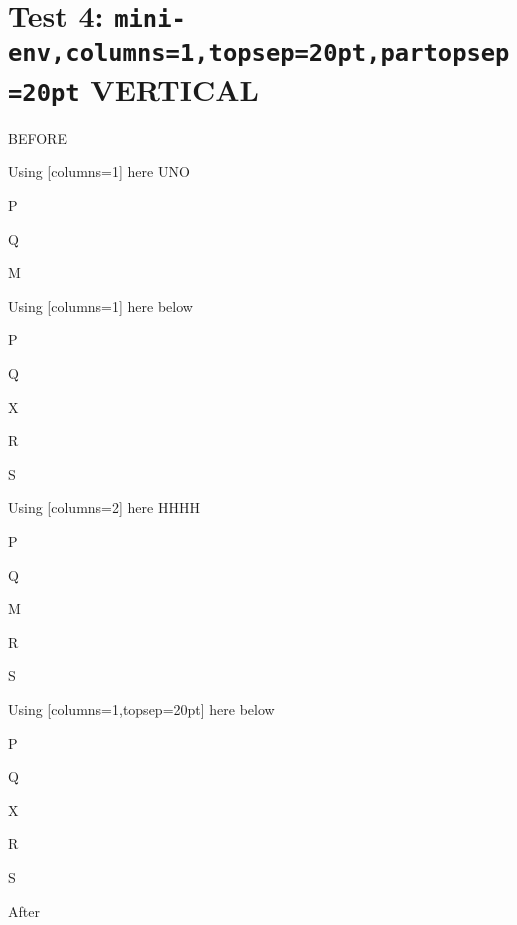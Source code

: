\documentclass[12pt]{article}
\begin{document}
\newpage

\section{Test 4: \texttt{mini-env,columns=1,topsep=20pt,partopsep=20pt} VERTICAL}

BEFORE
\begin{enumext}[columns=2]
\item Using [columns=1] here UNO

  \begin{enumext}[columns=1,topsep=20pt,partopsep=20pt]%
     \item  P \item Q \item M %
  \end{enumext}

\item Using [columns=1] here below

\begin{enumext}[columns=1,topsep=20pt,,partopsep=20pt]%
     \item  P \item Q \item X  \item R \item S
  \end{enumext}

\columnbreak

\item Using [columns=2] here HHHH

  \begin{enumext}[columns=2,topsep=20pt,partopsep=20pt]%
    \item  P \item Q \item M \item R \item S
  \end{enumext}

\item Using [columns=1,topsep=20pt] here below

\begin{enumext}[columns=1,topsep=20pt,,partopsep=20pt]%
     \item  P \item Q \item X  \item R \item S
  \end{enumext}

\end{enumext}
After
\end{document}
